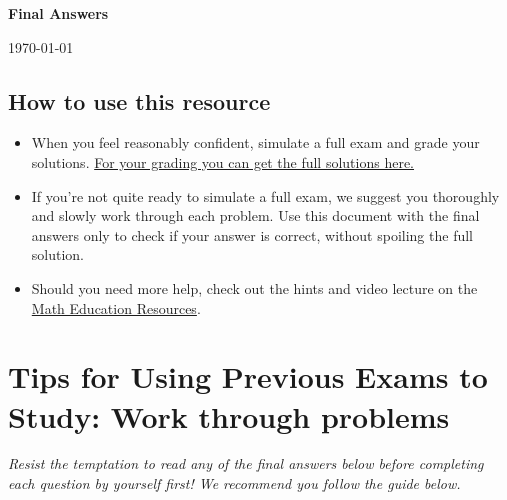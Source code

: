 \thispagestyle{empty}
\forkme[east]

\vspace{-1cm}

\begin{center}
{\huge \bf Final Answers \\[0.3cm] \course \exam}
\end{center}
\begin{flushright}\today\end{flushright}

\vspace{-0.5cm}

\subsection{How to use this resource}

\begin{itemize}
\item When you feel reasonably confident, simulate a full exam and grade your solutions. \href{http://matheducationresources.github.io/pdf_version/}{For your grading you can get the full solutions here.}
\item If you're not quite ready to simulate a full exam, we suggest you thoroughly and slowly work through each problem. Use this document with the final answers only to check if your answer is correct, without spoiling the full solution.
\item Should you need more help, check out the hints and video lecture on the \href{http://www.math-education-resources.com}{Math Education Resources}.
\end{itemize}


\section{Tips for Using Previous Exams to Study: Work through problems}

\emph{Resist the temptation to read any of the final answers below before completing each question by yourself first! We recommend you follow the guide below.}


